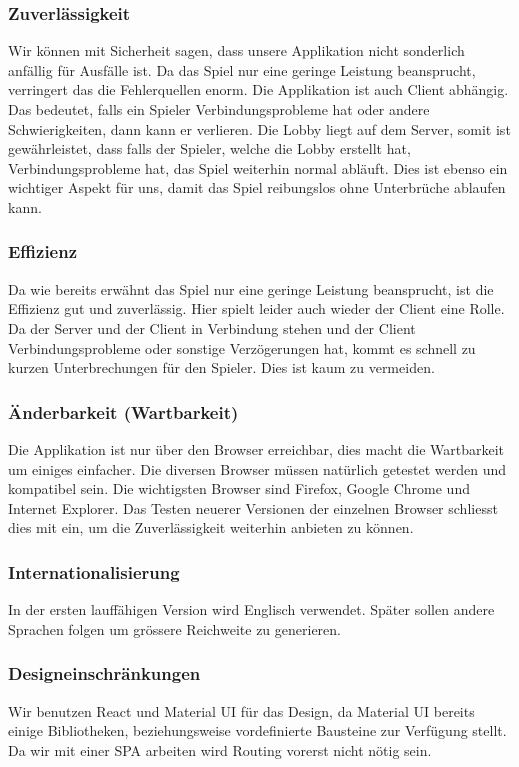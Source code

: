 \documentclass[11pt,ngerman]{article}
\begin{document}
    \subsubsection{Zuverlässigkeit}
    Wir können mit Sicherheit sagen, dass unsere Applikation nicht sonderlich anfällig für Ausfälle ist. Da das Spiel nur eine geringe Leistung beansprucht, verringert das die Fehlerquellen enorm. Die Applikation ist auch Client abhängig. Das bedeutet, falls ein Spieler Verbindungsprobleme hat oder andere Schwierigkeiten, dann kann er verlieren. Die Lobby liegt auf dem Server, somit ist gewährleistet, dass falls der Spieler, welche die Lobby erstellt hat, Verbindungsprobleme hat, das Spiel weiterhin normal abläuft. Dies ist ebenso ein wichtiger Aspekt für uns, damit das Spiel reibungslos ohne Unterbrüche ablaufen kann.
    \subsubsection{Effizienz}
    Da wie bereits erwähnt das Spiel nur eine geringe Leistung beansprucht, ist die Effizienz gut und zuverlässig. Hier spielt leider auch wieder der Client eine Rolle. Da der Server und der Client in Verbindung stehen und der Client Verbindungsprobleme oder sonstige Verzögerungen hat, kommt es schnell zu kurzen Unterbrechungen für den Spieler. Dies ist kaum zu vermeiden.
    \subsubsection{Änderbarkeit (Wartbarkeit)}
    Die Applikation ist nur über den Browser erreichbar, dies macht die Wartbarkeit um einiges einfacher. Die diversen Browser müssen natürlich getestet werden und kompatibel sein. Die wichtigsten Browser sind Firefox, Google Chrome und Internet Explorer.  Das Testen neuerer Versionen der einzelnen Browser schliesst dies mit ein, um die Zuverlässigkeit weiterhin anbieten zu können.
    \subsubsection{Internationalisierung}
    In der ersten lauffähigen Version wird Englisch verwendet. Später sollen andere Sprachen folgen um grössere Reichweite zu generieren.
    \subsubsection{Designeinschränkungen}
    Wir benutzen React und Material UI für das Design, da Material UI bereits einige Bibliotheken, beziehungsweise vordefinierte  Bausteine zur Verfügung stellt. Da wir mit einer \Gls{SPA} arbeiten wird Routing vorerst nicht nötig sein.
\end{document}
